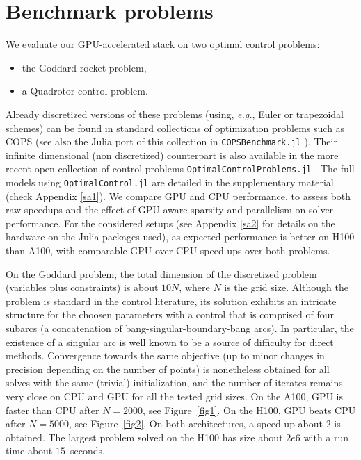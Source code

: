 \section{Benchmark problems}
We evaluate our GPU-accelerated stack on two optimal control problems:
\begin{itemize}
    \item the Goddard rocket problem,
    \item a Quadrotor control problem.
\end{itemize}
Already discretized versions of these problems (using, \emph{e.g.}, Euler or trapezoidal schemes) can be found in standard collections of optimization problems such as COPS \cite{xxxx} (see also the Julia port of this collection in \texttt{COPSBenchmark.jl} \cite{xxxx}). Their infinite dimensional (non discretized) counterpart is also available in the more recent open collection of control problems \texttt{OptimalControlProblems.jl} \cite{xxxx}. The full models using \texttt{OptimalControl.jl} are detailed in the supplementary material (check Appendix \ref{sa1}).
%
We compare GPU and CPU performance,
to assess both raw speedups and the effect of GPU-aware sparsity and parallelism on solver performance.
For the considered setups (see Appendix \ref{sa2} for details on the hardware on the Julia packages used), as expected performance is better on H100 than A100, with comparable GPU over CPU speed-ups over both problems.

On the Goddard problem, the total dimension of the discretized problem (variables plus constraints) is about $10 N$, where $N$ is the grid size. Although the problem is standard in the control literature, its solution exhibits an intricate structure for the choosen parameters with a control that is comprised of four subarcs (a concatenation of bang-singular-boundary-bang arcs). In particular, the existence of a singular arc is well known to be a source of difficulty for direct methods. Convergence towards the same objective (up to minor changes in precision depending on the number of points) is nonetheless obtained for all solves with the same (trivial) initialization, and the number of iterates remains very close on CPU and GPU for all the tested grid sizes.
On the A100, GPU is faster than CPU after $N = 2000$, see Figure~\ref{fig1}.
On the H100, GPU beats CPU after $N = 5000$, see Figure~\ref{fig2}.
On both architectures, a speed-up about $2$ is obtained.
The largest problem solved on the H100 has size about $2e6$ with a run time about $15$~seconds.

